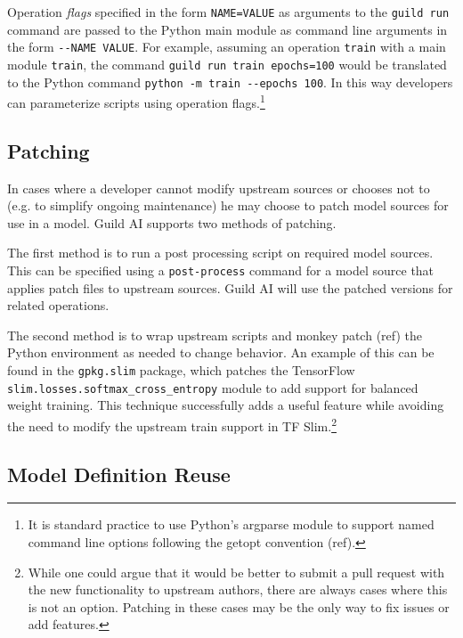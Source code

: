 \documentclass{article}
\begin{document}
Operation \emph{flags} specified in the form \verb|NAME=VALUE| as
arguments to the \verb|guild run| command are passed to the Python
main module as command line arguments in the form
\verb|--NAME VALUE|. For example, assuming an operation \verb|train|
with a main module \verb|train|, the command
\verb|guild run train epochs=100| would be translated to the Python
command \verb|python -m train --epochs 100|. In this way developers
can parameterize scripts using operation flags.\footnote{It is
  standard practice to use Python's argparse module to support named
  command line options following the getopt convention (ref).}

\iffalse
If a flag name doesn't correspond to the option name expected
(e.g. the train script expected the option \verb|num_epochs|) the
developer can specify an alternative argument name for a flag using
the \verb|arg-name| attribute.
\fi

\subsection{Patching}
\label{sec:patching}

In cases where a developer cannot modify upstream sources or chooses
not to (e.g. to simplify ongoing maintenance) he may choose to patch
model sources for use in a model. Guild AI supports two methods of
patching.

The first method is to run a post processing script on required model
sources. This can be specified using a \verb|post-process| command for
a model source that applies patch files to upstream sources. Guild AI
will use the patched versions for related operations.

The second method is to wrap upstream scripts and monkey patch (ref)
the Python environment as needed to change behavior. An example of
this can be found in the \verb|gpkg.slim| package, which patches the
TensorFlow \verb|slim.losses.softmax_cross_entropy| module to add
support for balanced weight training. This technique successfully adds
a useful feature while avoiding the need to modify the upstream train
support in TF Slim.\footnote{While one could argue that it would be
  better to submit a pull request with the new functionality to
  upstream authors, there are always cases where this is not an
  option. Patching in these cases may be the only way to fix issues or
  add features.}

\subsection{Model Definition Reuse}
\end{document}
